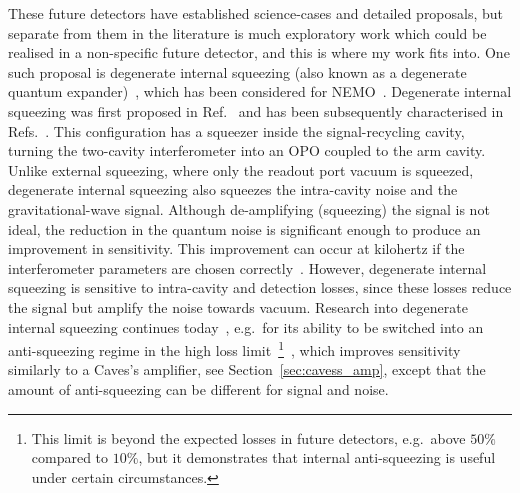 These future detectors have established science-cases  and detailed proposals, but separate from them in the literature is much exploratory work which could be realised in a non-specific future detector, and this is where my work fits into. %
One such proposal is degenerate internal squeezing (also known as a degenerate quantum expander)~\cite{Korobko2019,Adya2020}, which has been considered for NEMO~\cite{}. 
Degenerate internal squeezing was first proposed in Ref.~\cite{Korobko2019} and has been subsequently characterised in Refs.~\cite{Adya2020,Korobko?,}. 
This configuration has a squeezer inside the signal-recycling cavity, turning the two-cavity interferometer into an OPO coupled to the arm cavity. Unlike external squeezing, where only the readout port vacuum is squeezed, degenerate internal squeezing also squeezes the intra-cavity noise and the gravitational-wave signal. Although de-amplifying (squeezing) the signal is not ideal, the reduction in the quantum noise is significant enough to produce an improvement in sensitivity. This improvement can occur at kilohertz if the interferometer parameters are chosen correctly~\cite{}. However, degenerate internal squeezing is sensitive to intra-cavity and detection losses, since these losses reduce the signal but amplify the noise towards vacuum. 
Research into degenerate internal squeezing continues today~\cite{}, e.g.\ for its ability to be switched into an anti-squeezing regime in the high loss limit~\footnote{This limit is beyond the expected losses in future detectors, e.g.\ above $50\%$ compared to $10\%$, but it demonstrates that internal anti-squeezing is useful under certain circumstances.}~\cite{KorobkoTalk}, which improves sensitivity similarly to a Caves's amplifier, see Section~\ref{sec:cavess_amp}, except that the amount of anti-squeezing can be different for signal and noise.

